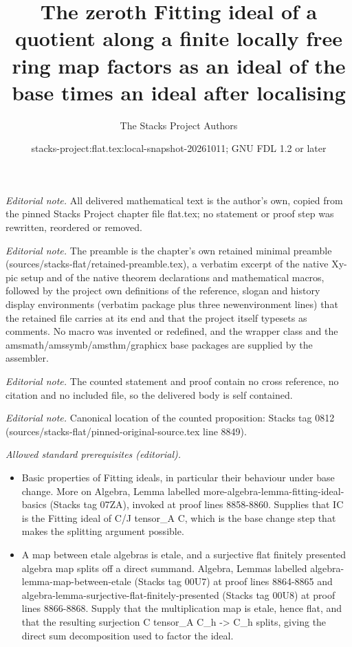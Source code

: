\documentclass[10pt,a4paper]{amsart}
\title{The zeroth Fitting ideal of a quotient along a finite locally free ring map factors as an ideal of the base times an ideal after localising}
\author{The Stacks Project Authors}
\date{stacks-project:flat.tex:local-snapshot-20261011; GNU FDL 1.2 or later}
\theoremstyle{plain}
\theoremstyle{definition}
\theoremstyle{remark}
\numberwithin{equation}{subsection}
\begin{document}
\maketitle
\noindent\textit{Editorial note.} All delivered mathematical text is the author's own, copied from the pinned Stacks Project chapter file flat.tex; no statement or proof step was rewritten, reordered or removed.\par\medskip
\noindent\textit{Editorial note.} The preamble is the chapter's own retained minimal preamble (sources/stacks-flat/retained-preamble.tex), a verbatim excerpt of the native Xy-pic setup and of the native theorem declarations and mathematical macros, followed by the project own definitions of the reference, slogan and history display environments (verbatim package plus three newenvironment lines) that the retained file carries at its end and that the project itself typesets as comments. No macro was invented or redefined, and the wrapper class and the amsmath/amssymb/amsthm/graphicx base packages are supplied by the assembler.\par\medskip
\noindent\textit{Editorial note.} The counted statement and proof contain no cross reference, no citation and no included file, so the delivered body is self contained.\par\medskip
\noindent\textit{Editorial note.} Canonical location of the counted proposition: Stacks tag 0812 (sources/stacks-flat/pinned-original-source.tex line 8849).\par\medskip
\noindent\textit{Allowed standard prerequisites (editorial).}\begin{itemize}
\item Basic properties of Fitting ideals, in particular their behaviour under base change. More on Algebra, Lemma labelled more-algebra-lemma-fitting-ideal-basics (Stacks tag 07ZA), invoked at proof lines 8858-8860. Supplies that IC is the Fitting ideal of C/J tensor\_A C, which is the base change step that makes the splitting argument possible.
\item A map between etale algebras is etale, and a surjective flat finitely presented algebra map splits off a direct summand. Algebra, Lemmas labelled algebra-lemma-map-between-etale (Stacks tag 00U7) at proof lines 8864-8865 and algebra-lemma-surjective-flat-finitely-presented (Stacks tag 00U8) at proof lines 8866-8868. Supply that the multiplication map is etale, hence flat, and that the resulting surjection C tensor\_A C\_h -> C\_h splits, giving the direct sum decomposition used to factor the ideal.
\end{itemize}\medskip
\end{document}
